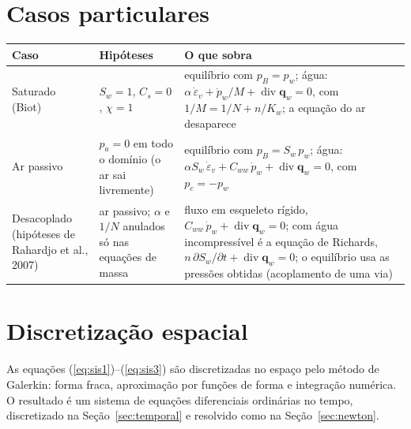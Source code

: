 \documentclass[11pt,a4paper]{article}
\newcommand{\vq}{\bm q}
\newcommand{\dv}{\operatorname{div}}
\begin{document}
\section{Casos particulares}

\begin{center}\small
\begin{minipage}{\textwidth}
\label{tab:casos}
\begin{tabularx}{\textwidth}{@{}>{\raggedright\arraybackslash}p{2.6cm}
                             >{\raggedright\arraybackslash}p{4.3cm} X@{}}
\toprule
Caso & Hipóteses & O que sobra\\
\midrule
Saturado (Biot) & $S_w=1$, $C_s=0$, $\chi=1$
 & equilíbrio com $p_B=p_w$; água: $\alpha\,\dot\varepsilon_v+\dot p_w/M+\dv\vq_w=0$,
   com $1/M=1/N+n/K_w$; a equação do ar desaparece\\
Ar passivo & $p_a=0$ em todo o domínio (o ar sai livremente)
 & equilíbrio com $p_B=S_w\,p_w$; água: $\alpha S_w\,\dot\varepsilon_v+C_{ww}\,\dot p_w+\dv\vq_w=0$,
   com $p_c=-p_w$\\
Desacoplado (hipóteses de Rahardjo et al., 2007)
 & ar passivo; $\alpha$ e $1/N$ anulados só nas equações de massa
 & fluxo em esqueleto rígido, $C_{ww}\,\dot p_w+\dv\vq_w=0$; com água incompressível é
   a equação de Richards, $n\,\partial S_w/\partial t+\dv\vq_w=0$; o equilíbrio usa as
   pressões obtidas (acoplamento de uma via)\\
\bottomrule
\end{tabularx}
\end{minipage}
\end{center}

\section{Discretização espacial}
\label{sec:espacial}

As equações (\ref{eq:sis1})--(\ref{eq:sis3}) são discretizadas no espaço pelo método de
Galerkin: forma fraca, aproximação por funções de forma e integração numérica. O resultado
é um sistema de equações diferenciais ordinárias no tempo, discretizado na
Seção~\ref{sec:temporal} e resolvido como na Seção~\ref{sec:newton}.
\end{document}
